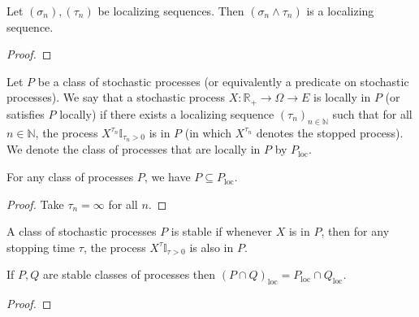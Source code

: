 \begin{lemma}\label{lem:localizingSequence_min}
Let $(\sigma_n), (\tau_n)$ be localizing sequences.
Then $(\sigma_n \wedge \tau_n)$ is a localizing sequence.
\end{lemma}

\begin{proof}

\end{proof}


\begin{definition}\label{def:locally}
  \leanok
Let $P$ be a class of stochastic processes (or equivalently a predicate on stochastic processes).
We say that a stochastic process $X : \mathbb{R}_+ \to \Omega \to E$ is locally in $P$ (or satisfies $P$ locally) if there exists a localizing sequence $(\tau_n)_{n \in \mathbb{N}}$ such that for all $n \in \mathbb{N}$, the process $X^{\tau_n}\mathbb{I}_{\tau_n > 0}$ is in $P$ (in which $X^{\tau_n}$ denotes the stopped process).
We denote the class of processes that are locally in $P$ by $P_{\mathrm{loc}}$.
\end{definition}


\begin{lemma}\label{lem:implies_locally}
  \leanok
For any class of processes $P$, we have $P \subseteq P_{\mathrm{loc}}$.
\end{lemma}

\begin{proof}
Take $\tau_n = \infty$ for all $n$.
\end{proof}


\begin{definition}\label{def:stable}
  \leanok
A class of stochastic processes $P$ is stable if whenever $X$ is in $P$, then for any stopping time $\tau$, the process $X^{\tau}\mathbb{I}_{\tau > 0}$ is also in $P$.
\end{definition}


\begin{lemma}\label{lem:locally_inter}
  \leanok
If $P, Q$ are stable classes of processes then $(P\cap Q)_{\mathrm{loc}} = P_{\mathrm{loc}}\cap Q_{\mathrm{loc}}$.
\end{lemma}

\begin{proof}

\end{proof}


